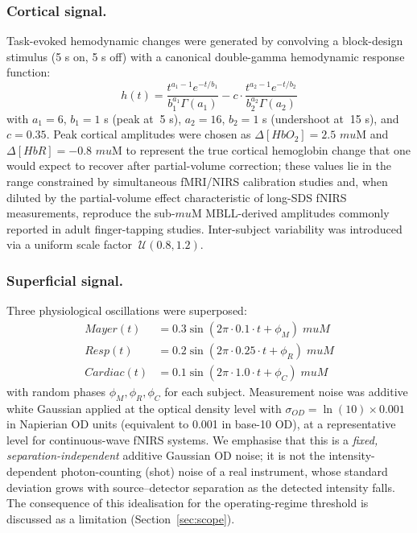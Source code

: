 \documentclass[11pt]{article}
\def\mu{mu}%
\def\sim{~}%
\def\mathrm#1{#1}%
\def\,{ }%
\begin{document}
\subsubsection{Cortical signal.}
Task-evoked hemodynamic changes were generated by convolving a block-design stimulus (5\,s on, 5\,s off) with a canonical double-gamma hemodynamic response function\cite{r29,r30}:
\begin{equation}
h(t) = \frac{t^{a_1 - 1}\,e^{-t/b_1}}{b_1^{a_1}\,\Gamma(a_1)} - c \cdot \frac{t^{a_2 - 1}\,e^{-t/b_2}}{b_2^{a_2}\,\Gamma(a_2)}
\label{eq:hrf}
\end{equation}
with $a_1 = 6$, $b_1 = 1$\,s (peak at $\sim$5\,s), $a_2 = 16$, $b_2 = 1$\,s (undershoot at $\sim$15\,s), and $c = 0.35$. Peak cortical amplitudes were chosen as $\Delta[\mathrm{HbO}_2] = 2.5$\,$\mu$M and $\Delta[\mathrm{HbR}] = -0.8$\,$\mu$M to represent the true cortical hemoglobin change that one would expect to recover after partial-volume correction; these values lie in the range constrained by simultaneous fMRI/NIRS calibration studies\cite{r31,r32} and, when diluted by the partial-volume effect characteristic of long-SDS fNIRS measurements, reproduce the sub-$\mu$M MBLL-derived amplitudes commonly reported in adult finger-tapping studies\cite{r33,r34,r35}. Inter-subject variability was introduced via a uniform scale factor $\sim\mathcal{U}(0.8, 1.2)$.

\subsubsection{Superficial signal.}
Three physiological oscillations were superposed:
\begin{align}
\mathrm{Mayer}(t) &= 0.3\sin(2\pi \cdot 0.1 \cdot t + \phi_M) \;\mu\mathrm{M} \label{eq:mayer}\\
\mathrm{Resp}(t) &= 0.2\sin(2\pi \cdot 0.25 \cdot t + \phi_R) \;\mu\mathrm{M} \label{eq:resp}\\
\mathrm{Cardiac}(t) &= 0.1\sin(2\pi \cdot 1.0 \cdot t + \phi_C) \;\mu\mathrm{M} \label{eq:cardiac}
\end{align}
with random phases $\phi_M, \phi_R, \phi_C$ for each subject\cite{r15,r16}. Measurement noise was additive white Gaussian applied at the optical density level with $\sigma_{\mathrm{OD}} = \ln(10) \times 0.001$ in Napierian OD units (equivalent to 0.001 in base-10 OD), at a representative level for continuous-wave fNIRS systems\cite{r1}. We emphasise that this is a \emph{fixed, separation-independent} additive Gaussian OD noise; it is not the intensity-dependent photon-counting (shot) noise of a real instrument, whose standard deviation grows with source--detector separation as the detected intensity falls. The consequence of this idealisation for the operating-regime threshold is discussed as a limitation (Section~\ref{sec:scope}).
\end{document}

